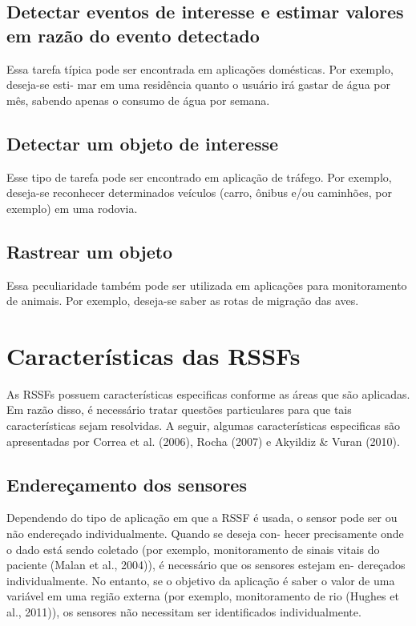 	\subsection{Detectar eventos de interesse e estimar valores em razão do evento detectado}
		Essa tarefa típica pode ser encontrada em aplicações domésticas. Por exemplo, deseja-se esti- mar em uma residência quanto o usuário irá gastar de água por mês, sabendo apenas o consumo de água por semana.
	
	\subsection{Detectar um objeto de interesse}
		Esse tipo de tarefa pode ser encontrado em aplicação de tráfego. Por exemplo, deseja-se reconhecer determinados veículos (carro, ônibus e/ou caminhões, por exemplo) em uma rodovia.
	
	\subsection{Rastrear um objeto}
		Essa peculiaridade também pode ser utilizada em aplicações para monitoramento de animais. Por exemplo, deseja-se saber as rotas de migração das aves.


\section{Características das RSSFs} 

As RSSFs possuem características especificas conforme as áreas que são aplicadas. Em razão disso, é necessário tratar questões particulares para que tais características sejam resolvidas. A seguir, algumas características especificas são apresentadas por Correa et al. (2006), Rocha (2007) e Akyildiz & Vuran (2010).

	
\subsection{Endereçamento dos sensores} 
	Dependendo do tipo de aplicação em que a RSSF é usada, o sensor pode ser ou não endereçado individualmente. Quando se deseja con- hecer precisamente onde o dado está sendo coletado (por exemplo, monitoramento de sinais vitais do paciente (Malan et al., 2004)), é necessário que os sensores estejam en- dereçados individualmente. No entanto, se o objetivo da aplicação é saber o valor de uma variável em uma região externa (por exemplo, monitoramento de rio (Hughes et al., 2011)), os sensores não necessitam ser identificados individualmente.
	
